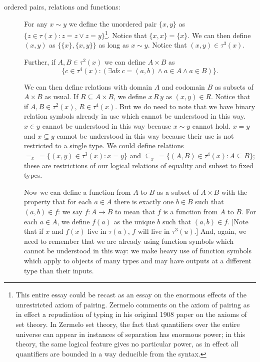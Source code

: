 \documentclass[12pt]{article}
\begin{document}
\begin{description}

\item[ordered pairs, relations and functions:]  For any $x \sim y$ we define the unordered pair $\{x,y\}$ as $\{z \in \tau(x):z=z \vee z=y\}$\footnote{This entire essay could be recast as an essay on the enormous effects of the unrestricted axiom of pairing.  Zermelo comments on the axiom of pairing as in effect a repudiation of typing in his original 1908 paper on the axioms of set theory.  In Zermelo set theory, the fact that quantifiers over the entire universe can appear in instances of separation has enormous power;  in this theory, the same logical feature gives no particular power, as in effect all quantifiers are bounded in a way deducible from the syntax.}.  Notice that $\{x,x\} = \{x\}$.  We can then define $(x,y)$ as
$\{\{x\},\{x,y\}\}$ as long as $x \sim y$.  Notice that $(x,y) \in \tau^3(x)$.

Further, if $A, B \in \tau^2(x)$ we can define $A \times B$ as $$\{c \in \tau^4(x):(\exists ab:c=(a,b) \wedge a \in A \wedge a \in B)\}.$$

We can then define relations with domain $A$ and codomain $B$ as subsets of $A \times B$ as usual.  If $R \subseteq A \times B$, we define $x \, R \, y$ as $(x,y)\in R$.  Notice that if $A,B \in \tau^2(x)$, $R \in \tau^4(x)$.  But we do need to note
that we have binary relation symbols already in use which cannot be understood in this way.  $x \in y$ cannot be understood in this way because $x \sim y$ cannot hold.  $x=y$ and $x \subseteq y$ cannot be understood in this way because their use is not restricted to a single type.  We could define relations $=_x \, = \{(x,y) \in \tau^3(x):x=y\}$ and $\subseteq_x \, = \{(A,B) \in \tau^4(x):A \subseteq B\}$;  these are restrictions of our logical relations of equality and subset to fixed types.

Now we can define a function from $A$ to $B$ as a subset of $A \times B$ with the property that for each $a \in A$ there is exactly one $b \in B$ such that $(a,b) \in f$:  we say $f:A \rightarrow B$ to mean that $f$ is a function from $A$ to $B$.  For each $a \in A$, we define $f(a)$ as the unique $b$ such that $(a,b)\in f$.  [Note that if $x$ and $f(x)$ live in $\tau(u)$,  $f$ will live in $\tau^3(u)$.]  And, again, we need to remember that we are already using function symbols which cannot be understood in this way:  we make heavy use of function symbols which apply to objects of many types and may have outputs at a different type than their inputs.


\end{description}
\end{document}
